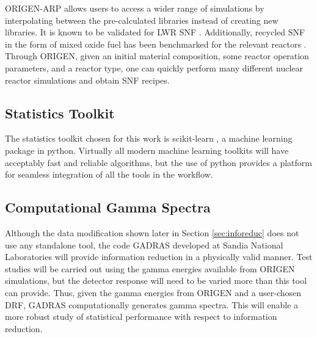 \gls{ORIGEN-ARP} allows users to access a wider range of simulations by
interpolating between the pre-calculated libraries instead of creating new
libraries.  It is known to be validated for \gls{LWR} \gls{SNF}
\cite{lwr_valid}. Additionally, recycled \gls{SNF} in the form of mixed oxide
fuel has been benchmarked for the relevant reactors \cite{mox_valid}.  Through
\gls{ORIGEN}, given an initial material composition, some reactor operation
parameters, and a reactor type, one can quickly perform many different nuclear
reactor simulations and obtain \gls{SNF} recipes.

\subsection{Statistics Toolkit}

The statistics toolkit chosen for this work is scikit-learn \cite{scikit}, a
machine learning package in python.  Virtually all modern machine learning
toolkits will have acceptably fast and reliable algorithms, but the use of
python provides a platform for seamless integration of all the tools in the
workflow. 

\subsection{Computational Gamma Spectra}

Although the data modification shown later in Section \ref{sec:inforeduc} does
not use any standalone tool, the code \gls{GADRAS} \cite{gadras} developed at
Sandia National Laboratories will provide information reduction in a physically
valid manner.  Test studies will be carried out using the gamma energies
available from \gls{ORIGEN} simulations, but the detector response will need to
be varied more than this tool can provide. Thus, given the gamma energies from
\gls{ORIGEN} and a user-chosen \gls{DRF}, \gls{GADRAS} computationally
generates gamma spectra.  This will enable a more robust study of statistical
performance with respect to information reduction.

